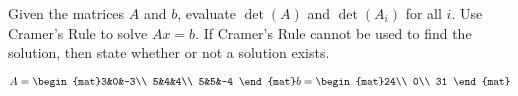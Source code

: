 
\begin{Exercise}[
name={},
title={}, 
difficulty=0,
origin={\cite{GH}}]
Given the matrices $A$ and $b$, evaluate $\det(A)$ and $\det(A_i)$ for all $i$.  Use Cramer's Rule 
to solve $Ax=b$.  If Cramer's Rule cannot be used to find the solution, then state whether or not a solution exists.
\begin{multicols}{2}
\Question $A=\begin{mat}3&0&-3\\  5&4&4\\  5&5&-4 \end{mat}\\ b=\begin{mat}24\\  0\\  31 \end{mat}$

\end{multicols}
\end{Exercise}
